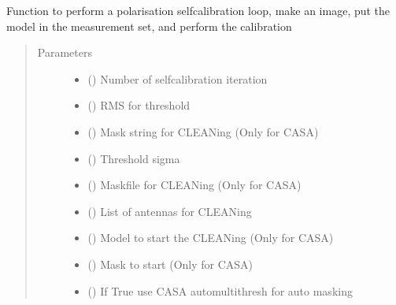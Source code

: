 \documentclass[letterpaper,10pt,english]{sphinxmanual}
\begin{document}
\begin{fulllineitems}
\begin{fulllineitems}
\sphinxAtStartPar
Function to perform a polarisation self\sphinxhyphen{}calibration loop, make an image, put the model in the measurement set, and perform the calibration
\begin{quote}\begin{description}
\item[{Parameters}] \leavevmode\begin{itemize}
\item {} 
\sphinxAtStartPar
{} () \textendash{} Number of self\sphinxhyphen{}calibration iteration

\item {} 
\sphinxAtStartPar
{} () \textendash{} RMS for threshold

\item {} 
\sphinxAtStartPar
{} () \textendash{} Mask string for CLEANing (Only for CASA)

\item {} 
\sphinxAtStartPar
{} () \textendash{} Threshold sigma

\item {} 
\sphinxAtStartPar
{} () \textendash{} Maskfile for CLEANing (Only for CASA)

\item {} 
\sphinxAtStartPar
{} () \textendash{} List of antennas for CLEANing

\item {} 
\sphinxAtStartPar
{} () \textendash{} Model to start the CLEANing (Only for CASA)

\item {} 
\sphinxAtStartPar
{} () \textendash{} Mask to start (Only for CASA)

\item {} 
\sphinxAtStartPar
{} () \textendash{} If True use CASA auto\sphinxhyphen{}multithresh for auto masking


\end{itemize}
\end{description}
\end{quote}
\end{fulllineitems}
\end{fulllineitems}
\end{document}

